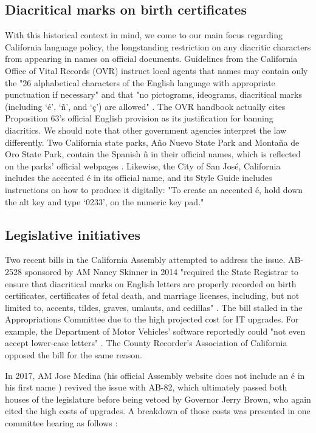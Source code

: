 \subsection{Diacritical marks on birth certificates}

With this historical context in mind, we come to our main focus regarding
California language policy, the longstanding restriction on any diacritic
characters from appearing in names on official documents. Guidelines from the
California Office of Vital Records (OVR) instruct local agents that names may
contain only the "26 alphabetical characters of the English language with
appropriate punctuation if necessary" and that "no pictograms, ideograms,
diacritical marks (including `é', `ñ', and `ç') are allowed"
\parencite{larson11}. The OVR handbook actually cites Proposition 63's official
English provision as its justification for banning diacritics. We should note
that other government agencies interpret the law differently. Two California
state parks, Año Nuevo State Park and Montaña de Oro State Park, contain the
Spanish ñ in their official names, which is reflected on the parks' official
webpages \parencite{año-nuevo} \parencite{montaña-de-oro} \parencite{larson11}.
Likewise, the City of San José, California includes the accented é in its
official name, and its Style Guide includes instructions on how to produce it
digitally: "To create an accented é, hold down the alt key and type `0233'‚ on
the numeric key pad." \parencite{san-josé}

\subsection{Legislative initiatives}

Two recent bills in the California Assembly attempted to address the issue.
AB-2528 sponsored by AM Nancy Skinner in 2014 "required the State Registrar to
ensure that diacritical marks on English letters are properly recorded on birth
certificates, certificates of fetal death, and marriage licenses, including,
but not limited to, accents, tildes, graves, umlauts, and cedillas"
\parencite{ab2528}. The bill stalled in the Appropriations Committee due to the
high projected cost for IT upgrades. For example, the Department of Motor
Vehicles' software reportedly could "not even accept lower-case letters"
\parencite{ab2528}. The County Recorder's Association of California opposed the
bill for the same reason.

In 2017, AM Jose Medina (his official Assembly website does not include an é in
his first name \parencite{medina}) revived the issue with AB-82, which
ultimately passed both houses of the legislature before being vetoed by
Governor Jerry Brown, who again cited the high costs of upgrades. A breakdown
of those costs was presented in one committee hearing as follows
\parencite{veto}:

